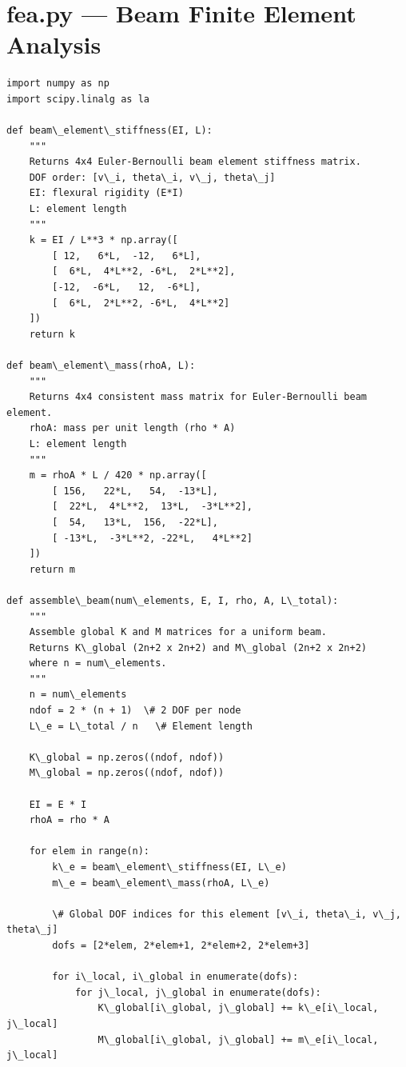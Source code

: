 \documentclass[12pt, a4paper]{article}
\begin{document}
\section{fea.py --- Beam Finite Element Analysis}
\begin{lstlisting}[style=codestyle, caption={{fea.py --- Beam Finite Element Analysis}}]
import numpy as np
import scipy.linalg as la

def beam\_element\_stiffness(EI, L):
    """
    Returns 4x4 Euler-Bernoulli beam element stiffness matrix.
    DOF order: [v\_i, theta\_i, v\_j, theta\_j]
    EI: flexural rigidity (E*I)
    L: element length
    """
    k = EI / L**3 * np.array([
        [ 12,   6*L,  -12,   6*L],
        [  6*L,  4*L**2, -6*L,  2*L**2],
        [-12,  -6*L,   12,  -6*L],
        [  6*L,  2*L**2, -6*L,  4*L**2]
    ])
    return k

def beam\_element\_mass(rhoA, L):
    """
    Returns 4x4 consistent mass matrix for Euler-Bernoulli beam element.
    rhoA: mass per unit length (rho * A)
    L: element length
    """
    m = rhoA * L / 420 * np.array([
        [ 156,   22*L,   54,  -13*L],
        [  22*L,  4*L**2,  13*L,  -3*L**2],
        [  54,   13*L,  156,  -22*L],
        [ -13*L,  -3*L**2, -22*L,   4*L**2]
    ])
    return m

def assemble\_beam(num\_elements, E, I, rho, A, L\_total):
    """
    Assemble global K and M matrices for a uniform beam.
    Returns K\_global (2n+2 x 2n+2) and M\_global (2n+2 x 2n+2)
    where n = num\_elements.
    """
    n = num\_elements
    ndof = 2 * (n + 1)  \# 2 DOF per node
    L\_e = L\_total / n   \# Element length
    
    K\_global = np.zeros((ndof, ndof))
    M\_global = np.zeros((ndof, ndof))
    
    EI = E * I
    rhoA = rho * A
    
    for elem in range(n):
        k\_e = beam\_element\_stiffness(EI, L\_e)
        m\_e = beam\_element\_mass(rhoA, L\_e)
        
        \# Global DOF indices for this element [v\_i, theta\_i, v\_j, theta\_j]
        dofs = [2*elem, 2*elem+1, 2*elem+2, 2*elem+3]
        
        for i\_local, i\_global in enumerate(dofs):
            for j\_local, j\_global in enumerate(dofs):
                K\_global[i\_global, j\_global] += k\_e[i\_local, j\_local]
                M\_global[i\_global, j\_global] += m\_e[i\_local, j\_local]
    

\end{lstlisting}
\end{document}
